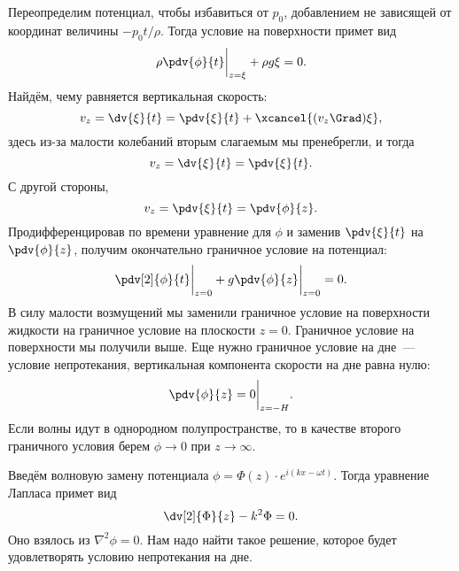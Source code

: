 Переопределим потенциал, чтобы избавиться от $p_0$, добавлением не зависящей от координат величины $-p_0t/\rho$. Тогда условие на поверхности примет вид
\begin{equation}
	\rho\pdv{\phi}{t}\bigg|_{z=\xi}+\rho g\xi=0.
\end{equation}
Найдём, чему равняется вертикальная скорость:
\begin{equation}
	v_z=\dv{\xi}{t}=\pdv{\xi}{t}+\xcancel{(v_z\Grad)\xi},
\end{equation}
здесь из-за малости колебаний вторым слагаемым мы пренебрегли,  и тогда
\begin{equation}
	v_z=\dv{\xi}{t}=\pdv{\xi}{t}.
\end{equation}
С другой стороны,
\begin{equation}
	v_z=\pdv{\xi}{t}=\pdv{\phi}{z}.
\end{equation}
Продифференцировав по времени уравнение для $\phi$ и заменив $\pdv{\xi}{t}$ на $\pdv{\phi}{z}$, получим окончательно граничное условие  на потенциал:
\begin{equation}
	\pdv[2]{\phi}{t}\bigg|_{z=0}+g\pdv{\phi}{z}\bigg|_{z=0}=0.
\end{equation}
В силу малости возмущений мы заменили граничное условие на поверхности жидкости на граничное условие на плоскости $z=0$. Граничное условие на поверхности мы получили выше. Еще нужно граничное условие на дне~--- условие непротекания, вертикальная компонента скорости на дне равна нулю:
\begin{equation}
	\pdv{\phi}{z}=0 \bigg|_{z=-H}.
\end{equation}
Если волны идут в однородном полупространстве, то в качестве второго граничного условия берем $\phi \to 0$ при $z\to\infty$.

Введём волновую замену потенциала $\phi=\Phi(z)\cdot e^{i(kx- \omega t)}$. Тогда уравнение Лапласа примет вид
\begin{equation}
	\dv[2]{\Phi}{z}-k^2\Phi=0.
\end{equation}
Оно взялось из $\nabla^2\phi=0$. Нам надо найти такое решение, которое будет удовлетворять условию непротекания на дне.

